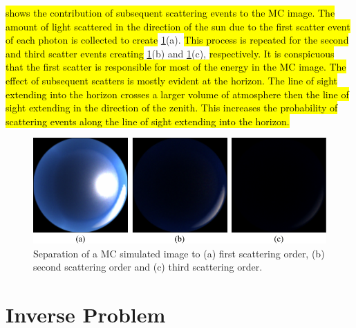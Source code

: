 \documentclass[10pt,letterpaper]{article}
\newcommand{\yoavcomment}[1]{}
\renewcommand{\yoavcomment}[1]{#1} %
\begin{document}
 \hl{shows the contribution of subsequent
scattering events to the MC image. The amount of light scattered
in the direction of the sun due to the first scatter event of each photon
is collected to create} \cref{fig:scatter_order}(a). \hl{This process
is repeated for the second and third scatter events creating}
\cref{fig:scatter_order}(b) and \cref{fig:scatter_order}(c),
\hl{respectively. It is conspicuous that the first scatter is responsible
for most of the energy in the MC image. The effect of subsequent scatters
is mostly evident at the horizon. The line of sight extending into the
horizon crosses a larger volume of atmosphere then the line of sight extending
in the direction of the zenith. This increases the probability of
scattering events along the line of sight extending into the horizon.}
\begin{figure}[h]
  \centering
  \yoavcomment{\includegraphics{images/scatter_order.pdf}}
  \caption{\small Separation of a MC simulated image to (a) first
   scattering order, (b) second scattering order and (c) third
   scattering order. }
  \label{fig:scatter_order}
\end{figure}


\section{Inverse Problem}
\label{sec:inverse-problem}
\end{document}
